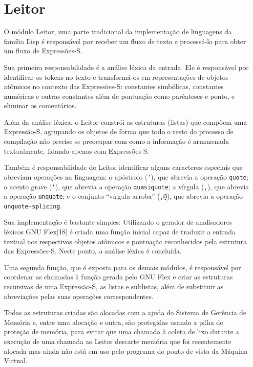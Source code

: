 \section{Leitor}
\label{sec:leitor}

O módulo Leitor, uma parte tradicional da implementação de linguagens da
família Lisp é responsável por receber um fluxo de texto e processá-lo para
obter um fluxo de Expressões-S.

Sua primeira responsabilidade é a análise léxica da entrada. Ele é responsável
por identificar os tokens no texto e transformá-os em representações de
objetos atômicos no contexto das Expressões-S: constantes simbólicas,
constantes numéricas e outras constantes além de pontuação como parênteses e
ponto, e eliminar os comentários. 

Além da análise léxica, o Leitor constrói as estruturas
(listas) que compõem uma Expressão-S, agrupando os objetos de forma que todo o
resto do processo de compilação não precise se preocupar com como a informação
é armazenada textualmente, lidando apenas com Expressões-S.

Também é responsabilidade do Leitor identificar alguns caracteres especiais que
abreviam operações na linguagem: o apóstrofo (\texttt{'}), que abrevia a operação
\texttt{quote}; o acento grave (\texttt{`}), que abrevia a operação \texttt{quasiquote};
a vírgula (\texttt{,}), que abrevia a operação \texttt{unquote}; e o conjunto
``vírgula-arroba'' (\texttt{,@}), que abrevia a operação \texttt{unquote-splicing}.

Sua implementação é bastante simples: Utilizando o gerador de analisadores
léxicos GNU Flex[18] é criada uma função inicial capaz de traduzir a entrada
textual nos respectivos objetos atômicos e pontuação reconhecidos pela
estrutura das Expressões-S. Neste ponto, a análise léxica é concluída. 

Uma segunda função, que é exposta para os demais módulos, é responsável por
coordenar as chamadas à função gerada pelo GNU Flex e criar as estruturas
recursivas de uma Expressão-S, as listas e sublistas, além de substituir as 
abreviações pelas suas operações correspondentes.

Todas as estruturas criadas são alocadas com a ajuda do Sistema de Gerência de
Memória e, entre uma alocação e outra, são protegidas usando a pilha de
proteção de memória, para evitar que uma chamada à coleta de lixo durante a
execução de uma chamada ao Leitor descarte memória que foi recentemente alocada
mas ainda não está em uso pelo programa do ponto de vista da Máquina Virtual.




